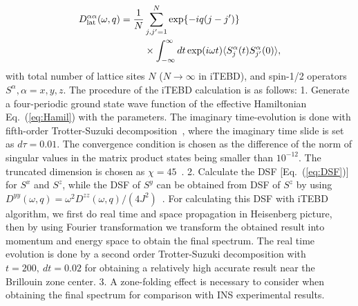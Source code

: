 \documentclass[aps,prl,twocolumn,superscriptaddress,groupedaddress]{revtex4}
\begin{document}
\begin{align}
\begin{split}
D_{\rm{lat}}^{\alpha\alpha}(\omega,q)=\frac{1}{N}&\sum_{j,j'=1}^{N}\exp\{-iq(j-j')\}\\
&\times\int_{-\infty}^{\infty}dt \exp(i\omega t)\langle S_{j}^{\alpha}(t)S_{j'}^{\alpha}(0)\rangle,
\label{eq:DSF}
\end{split}
\end{align}
with total number of lattice sites $N$ ($N \to \infty$ in iTEBD), and spin-1/2 operators $S^{\alpha},\alpha=x,y,z$. The procedure of the iTEBD calculation is as follows: 1. Generate a four-periodic ground state wave function of the effective Hamiltonian Eq.~(\ref{eq:Hamil}) with the parameters. The imaginary time-evolution is done
with fifth-order Trotter-Suzuki decomposition~\cite{Hatano2005}, where the imaginary time
slide is set as $d\tau=0.01$. The convergence condition is chosen as the
difference of the norm of singular values in the matrix product states being smaller than $10^{-12}$. The truncated dimension is chosen as $\chi=45$~\cite{PhysRevLett.98.070201,PhysRevA.79.043601}. 2. Calculate the DSF [Eq.~(\ref{eq:DSF})]
for $S^{x}$ and $S^{z}$, while the DSF of $S^{y}$ can be obtained from DSF of $S^{z}$ by using $D^{yy}(\omega,q)=\omega^2 D^{zz}(\omega,q)/(4J^2)$~\cite{PhysRevLett.113.247201}. For calculating this DSF with iTEBD algorithm, we first do real time and space propagation in Heisenberg picture, then by using Fourier transformation
we transform the obtained result into momentum and energy space
to obtain the final spectrum. The real time evolution is done
by a second order Trotter-Suzuki decomposition with $t=200,~dt=0.02$ for obtaining a relatively high accurate result near the Brillouin zone center. 3. A zone-folding effect is necessary to consider when obtaining the final spectrum for comparison with INS experimental results.



\end{document}

